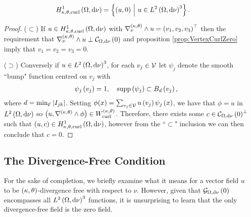 \begin{cory} \label{cory:VertexCurlSob}
	\begin{align*}
		H^1_{\kappa,\theta,\mathrm{curl}}\left( \Omega, \mathrm{d}\nu \right) &= \left\{  \left( u,0 \right) \ \middle\vert \  u\in L^{2}\left( \Omega,\mathrm{d}\nu \right)^3  \right\}.
	\end{align*}
\end{cory}
\begin{proof}
	($\subset$) If $u\in H^1_{\kappa,\theta,\mathrm{curl}}\left( \Omega, \mathrm{d}\nu \right)$ with $\nabla_{\nu}^{\left( \kappa, \theta \right)}\wedge u=\left( v_1,v_2,v_3 \right)^\top$ then the requirement that $\nabla_{\nu}^{\left( \kappa, \theta \right)}\wedge u \perp \mathcal{C}_{ \Omega, \mathrm{d}\nu}\left( 0 \right)$ and proposition \ref{prop:VertexCurlZero} imply that $v_1=v_2=v_3=0$.
	
	($\supset$) Conversely if $u\in L^{2}\left( \Omega,\mathrm{d}\nu \right)^3$, for each $v_j\in\mathcal{V}$ let $\psi_j$ denote the smooth ``bump" function centred on $v_j$ with
	\begin{align*}
		\psi_j\left( v_j \right) = 1, \quad
		\mathrm{supp}\left( \psi_j \right) \subset B_d\left( v_j \right),
	\end{align*}
	where $d=\min_{\mathcal{E}}\left\lvert I_{jk} \right\rvert$.
	Setting $\phi(x) = \sum_{v_j\in\mathcal{V}}u\left( v_j \right)\psi_j\left( x \right)$, we have that $\phi=u$ in $L^{2}\left( \Omega,\mathrm{d}\nu \right)$ so $\left( u,\nabla_{}^{\left( \kappa, \theta \right)}\wedge\phi \right)\in W^{\left( \kappa, \theta \right)}_{\mathrm{curl}}$.
	Therefore, there exists some $c\in\mathcal{C}_{ \Omega, \mathrm{d}\nu}\left( 0 \right)^{\perp}$ such that $\left( u,c \right)\in H^1_{\kappa,\theta,\mathrm{curl}}\left( \Omega, \mathrm{d}\nu \right)$, however from the ``$\subset$" inclusion we can then conclude that $c = 0$.
\end{proof}

\subsection{The Divergence-Free Condition} \label{apps:DivFreeVertex}
For the sake of completion, we briefly examine what it means for a vector field $u$ to be $\left( \kappa, \theta \right)$-divergence free with respect to $\nu$.
However, given that $\mathcal{G}_{ \Omega, \mathrm{d}\nu}\left( 0 \right)$ encompasses all $L^{2}\left( \Omega,\mathrm{d}\nu \right)^3$ functions, it is unsurprising to learn that the only divergence-free field is the zero field.

